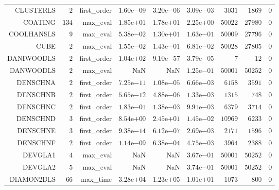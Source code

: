 \begin{longtable}{rrrrrrrrr}
CLUSTERLS & \(     2\) & first\_order & \( 1.60\)e\(-09\) & \( 3.20\)e\(-06\) & \( 3.09\)e\(-03\) & \(  3031\) & \(  1869\) & \(     0\) \\
COATING & \(   134\) & max\_eval & \( 1.85\)e\(+01\) & \( 1.78\)e\(+01\) & \( 2.25\)e\(+00\) & \( 50022\) & \( 27980\) & \(     0\) \\
COOLHANSLS & \(     9\) & max\_eval & \( 5.38\)e\(-02\) & \( 1.30\)e\(+01\) & \( 1.63\)e\(-01\) & \( 50009\) & \( 27796\) & \(     0\) \\
CUBE & \(     2\) & max\_eval & \( 1.55\)e\(-02\) & \( 1.43\)e\(-01\) & \( 6.81\)e\(-02\) & \( 50028\) & \( 27805\) & \(     0\) \\
DANIWOODLS & \(     2\) & first\_order & \( 1.04\)e\(+02\) & \( 9.10\)e\(-57\) & \( 3.79\)e\(-05\) & \(     7\) & \(    12\) & \(     0\) \\
DANWOODLS & \(     2\) & max\_eval &       NaN &       NaN & \( 1.25\)e\(-01\) & \( 50001\) & \( 50252\) & \(     0\) \\
DENSCHNA & \(     2\) & first\_order & \( 7.25\)e\(-11\) & \( 1.08\)e\(-05\) & \( 6.66\)e\(-03\) & \(  6158\) & \(  3591\) & \(     0\) \\
DENSCHNB & \(     2\) & first\_order & \( 5.65\)e\(-12\) & \( 4.88\)e\(-06\) & \( 1.33\)e\(-03\) & \(  1315\) & \(   748\) & \(     0\) \\
DENSCHNC & \(     2\) & first\_order & \( 1.83\)e\(-01\) & \( 1.38\)e\(-03\) & \( 9.91\)e\(-03\) & \(  6379\) & \(  3714\) & \(     0\) \\
DENSCHND & \(     3\) & first\_order & \( 8.54\)e\(+00\) & \( 2.45\)e\(+01\) & \( 1.45\)e\(-02\) & \( 10969\) & \(  6233\) & \(     0\) \\
DENSCHNE & \(     3\) & first\_order & \( 9.38\)e\(-14\) & \( 6.12\)e\(-07\) & \( 2.69\)e\(-03\) & \(  2171\) & \(  1596\) & \(     0\) \\
DENSCHNF & \(     2\) & first\_order & \( 1.14\)e\(-09\) & \( 6.38\)e\(-04\) & \( 4.75\)e\(-03\) & \(  3964\) & \(  2388\) & \(     0\) \\
DEVGLA1 & \(     4\) & max\_eval &       NaN &       NaN & \( 3.67\)e\(-01\) & \( 50001\) & \( 50252\) & \(     0\) \\
DEVGLA2 & \(     5\) & max\_eval &       NaN &       NaN & \( 3.74\)e\(-01\) & \( 50001\) & \( 50252\) & \(     0\) \\
DIAMON2DLS & \(    66\) & max\_time & \( 3.28\)e\(+04\) & \( 1.23\)e\(+05\) & \( 1.01\)e\(+01\) & \(  1073\) & \(   800\) & \(     0\) \\

\end{longtable}
